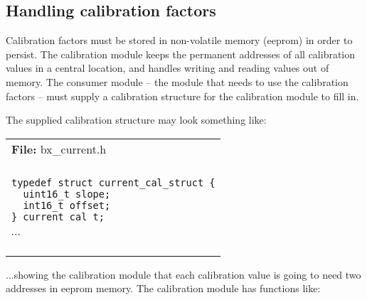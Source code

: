 \clearpage{}
\subsection{Handling calibration factors}

Calibration factors must be stored in non-volatile memory (eeprom) in
order to persist.  The calibration module keeps the permanent
addresses of all calibration values in a central location, and handles
writing and reading values out of memory.  The consumer module -- the
module that needs to use the calibration factors -- must supply a
calibration structure for the calibration module to fill in.

The supplied calibration structure may look something like:
\begin{center}
  \vspace{-\baselineskip}
  \begin{tabular}{|l|} \hline
    \rowcolor[gray]{0.8}
    \begin{minipage}[c]{\textwidth - 2\tabcolsep}
      \textbf{File:}
      bx\_current.h
    \end{minipage}\\
    \begin{minipage}[c]{\textwidth - 2\tabcolsep}
      \vspace{0.5\baselineskip}
      $\cdots$ \\
      \begin{minipage}[c]{\textwidth - 2\tabcolsep}
        \lstset{language=c}
        \begin{lstlisting}
typedef struct current_cal_struct {
  uint16_t slope;
  int16_t offset;
} current_cal_t;
        \end{lstlisting}
      \end{minipage}
      $\cdots$\\
      \vspace{-0.5\baselineskip}
    \end{minipage}\\
    \hline
  \end{tabular}
\end{center}
...showing the calibration module that each calibration value is going
to need two addresses in eeprom memory.  The calibration module has functions like:
